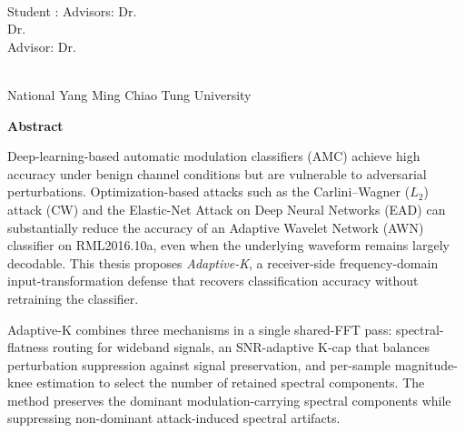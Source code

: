 \begin{center}
    \large

    \begin{singlespace}
        \textbf{\englishTitle{}} \\[0.5cm]
    \end{singlespace}

    \begin{singlespace}
        Student : \studentEnName{}  \hspace{1.0cm}
        \ifdefined\advisorCnNameB
            Advisors: Dr.\, \advisorEnName \\
            \hspace{6.6cm} Dr.\, \advisorEnNameB  \\
        \else
            Advisor: Dr.\, \advisorEnName \\
        \fi
    \end{singlespace}

    \vspace{0.5cm}
    \begin{singlespace}
        \NameofDepartmentInstituteEN\\
        National Yang Ming Chiao Tung University\\[0.2cm]
    \end{singlespace}

    \textbf{Abstract} \\[0.5cm]

\end{center}

\normalsize

Deep-learning-based automatic modulation classifiers (AMC) achieve high
accuracy under benign channel conditions but are vulnerable to adversarial
perturbations. Optimization-based attacks such as the Carlini--Wagner ($L_2$)
attack (CW) and the Elastic-Net Attack on Deep Neural Networks (EAD) can
substantially reduce the accuracy of an Adaptive Wavelet Network (AWN)
classifier on RML2016.10a, even when the underlying waveform remains largely
decodable. This thesis proposes \emph{Adaptive-K}, a receiver-side
frequency-domain input-transformation defense that recovers classification
accuracy without retraining the classifier.

Adaptive-K combines three mechanisms in a single shared-FFT pass:
spectral-flatness routing for wideband signals, an SNR-adaptive K-cap that
balances perturbation suppression against signal preservation, and per-sample
magnitude-knee estimation to select the number of retained spectral
components. The method preserves the dominant modulation-carrying spectral
components while suppressing non-dominant attack-induced spectral artifacts.

